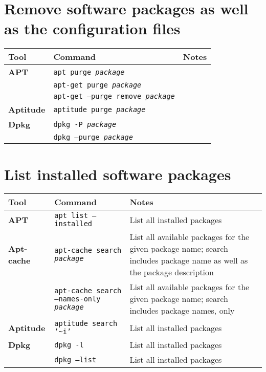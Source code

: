\documentclass[10pt]{article}
\begin{document}
\section{Remove software packages as well as the configuration files}
\begin{tabular}{ p{3.5cm} p{9cm} p{11cm}}
  \hline
  \rowcolor{Gray}
  \textbf{Tool} & \textbf{Command} & \textbf{Notes} \\
  \hline 
  \textbf{APT}& \texttt{apt purge \textit{package}} & \\
  \rowcolor{Gray}
  & \texttt{apt-get purge \textit{package}} & \\
  & \texttt{apt-get --purge remove \textit{package}} & \\
  \rowcolor{Gray}
  \textbf{Aptitude} & \texttt{aptitude purge \textit{package}} & \\
  \textbf{Dpkg} & \texttt{dpkg -P \textit{package}} & \\
  \rowcolor{Gray}
  & \texttt{dpkg --purge \textit{package}} & \\
  \hline
\end{tabular}

\newpage

\cheatsheet

\section{List installed software packages}
\begin{tabular}{ p{3.5cm} p{9cm} p{11cm}}
  \hline
  \rowcolor{Gray}
  \textbf{Tool} & \textbf{Command} & \textbf{Notes} \\
  \hline 
  \textbf{APT}& \texttt{apt list --installed} & List all installed packages\\
  \rowcolor{Gray}
  \textbf{Apt-cache} & \texttt{apt-cache search \textit{package}} & List all available packages for the given package name; search includes package name as well as the package description \\
  & \texttt{apt-cache search --names-only \textit{package}} & List all available packages for the given package name; search includes package names, only \\
  \rowcolor{Gray}
  \textbf{Aptitude} & \texttt{aptitude search '\textasciitilde{}i'} & List all installed packages \\
  \textbf{Dpkg} & \texttt{dpkg -l} & List all installed packages \\
  \rowcolor{Gray}
  & \texttt{dpkg --list} & List all installed packages \\
  \hline
\end{tabular}
\end{document}
